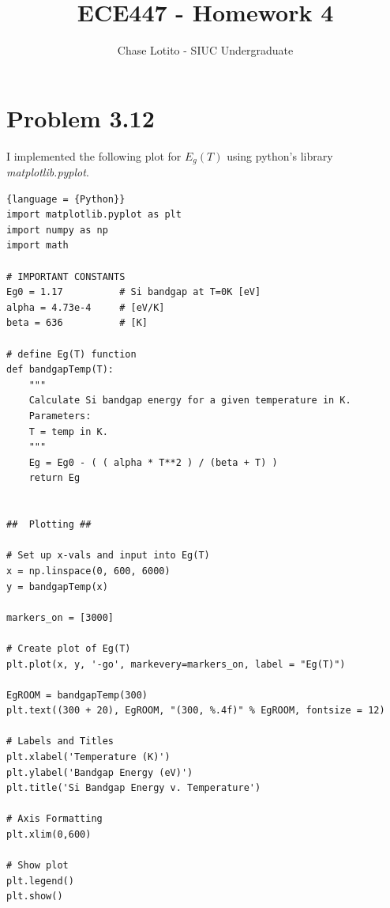 \documentclass{article}
\title{ECE447 - Homework 4}
\author{Chase Lotito - SIUC Undergraduate}
\date{}
\begin{document}
\pagestyle{fancy}

\maketitle

\fancyhead{}

\section{Problem 3.12}

I implemented the following plot for \(E_g(T)\) using python's library \textit{matplotlib.pyplot}.

\begin{lstlisting}{language = {Python}}
import matplotlib.pyplot as plt
import numpy as np
import math

# IMPORTANT CONSTANTS
Eg0 = 1.17          # Si bandgap at T=0K [eV]
alpha = 4.73e-4     # [eV/K]
beta = 636          # [K]

# define Eg(T) function
def bandgapTemp(T):
    """
    Calculate Si bandgap energy for a given temperature in K.
    Parameters:
    T = temp in K.
    """
    Eg = Eg0 - ( ( alpha * T**2 ) / (beta + T) )
    return Eg


##  Plotting ##

# Set up x-vals and input into Eg(T)
x = np.linspace(0, 600, 6000)
y = bandgapTemp(x)

markers_on = [3000]

# Create plot of Eg(T)
plt.plot(x, y, '-go', markevery=markers_on, label = "Eg(T)")

EgROOM = bandgapTemp(300)
plt.text((300 + 20), EgROOM, "(300, %.4f)" % EgROOM, fontsize = 12)

# Labels and Titles
plt.xlabel('Temperature (K)')
plt.ylabel('Bandgap Energy (eV)')
plt.title('Si Bandgap Energy v. Temperature')

# Axis Formatting
plt.xlim(0,600)

# Show plot
plt.legend()
plt.show()
\end{lstlisting}
\end{document}

